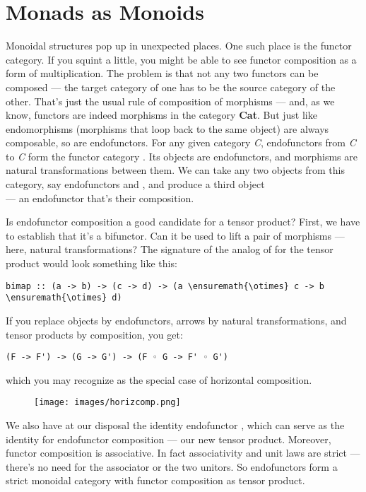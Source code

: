 \section{Monads as Monoids}\label{monads-as-monoids}

Monoidal structures pop up in unexpected places. One such place is the
functor category. If you squint a little, you might be able to see
functor composition as a form of multiplication. The problem is that not
any two functors can be composed --- the target category of one has to
be the source category of the other. That's just the usual rule of
composition of morphisms --- and, as we know, functors are indeed
morphisms in the category \textbf{Cat}. But just like endomorphisms
(morphisms that loop back to the same object) are always composable, so
are endofunctors. For any given category \emph{C}, endofunctors from
\emph{C} to \emph{C} form the functor category \code{{[}C, C{]}}. Its
objects are endofunctors, and morphisms are natural transformations
between them. We can take any two objects from this category, say
endofunctors  and , and produce a third object\\
 --- an endofunctor that's their composition.

Is endofunctor composition a good candidate for a tensor product? First,
we have to establish that it's a bifunctor. Can it be used to lift a
pair of morphisms --- here, natural transformations? The signature of
the analog of  for the tensor product would look something
like this:

\begin{Verbatim}[commandchars=\\\{\}]
bimap :: (a -> b) -> (c -> d) -> (a \ensuremath{\otimes} c -> b \ensuremath{\otimes} d)
\end{Verbatim}
If you replace objects by endofunctors, arrows by natural
transformations, and tensor products by composition, you get:

\begin{Verbatim}[commandchars=\\\{\}]
(F -> F') -> (G -> G') -> (F ◦ G -> F' ◦ G')
\end{Verbatim}
which you may recognize as the special case of horizontal composition.

\begin{figure}[H]
\centering
\texttt{[image: images/horizcomp.png]}
\end{figure}

\noindent
We also have at our disposal the identity endofunctor , which
can serve as the identity for endofunctor composition --- our new tensor
product. Moreover, functor composition is associative. In fact
associativity and unit laws are strict --- there's no need for the
associator or the two unitors. So endofunctors form a strict monoidal
category with functor composition as tensor product.

